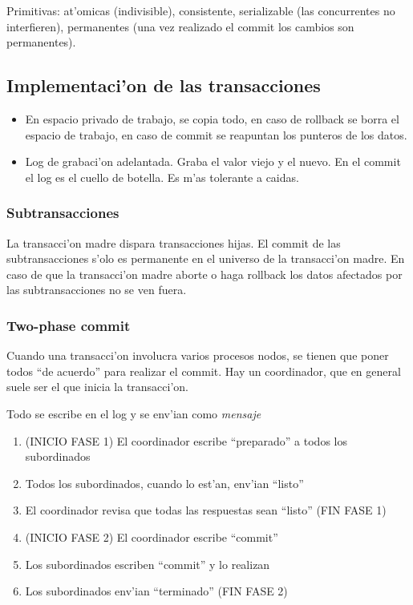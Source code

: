 \documentclass[a4paper,spanish]{article}
\begin{document}
Primitivas: at'omicas (indivisible), consistente, serializable (las concurrentes no
interfieren), permanentes (una vez realizado el commit los cambios son
permanentes).

\subsection{Implementaci'on de las transacciones}
\begin{itemize}
	\item En espacio privado de trabajo, se copia todo, en caso de rollback
se borra el espacio de trabajo, en caso de commit se reapuntan los punteros de
los datos.
	\item Log de grabaci'on adelantada. Graba el valor viejo y el nuevo. En
el commit el log es el cuello de botella. Es m'as tolerante a caidas.
\end{itemize}

\subsubsection{Subtransacciones}
La transacci'on madre dispara transacciones hijas. El commit de las
subtransacciones s'olo es permanente en el universo de la transacci'on madre.
En caso de que la transacci'on madre aborte o haga rollback los datos afectados
por las subtransacciones no se ven fuera.

\subsubsection{Two-phase commit}
Cuando una transacci'on involucra varios procesos nodos, se tienen que poner
todos ``de acuerdo'' para realizar el commit. Hay un coordinador, que en
general suele ser el que inicia la transacci'on.

Todo se escribe en el log y se env'ian como \emph{mensaje}
\begin{enumerate}
	\item (INICIO FASE 1) El coordinador escribe ``preparado'' a todos los
subordinados
	\item Todos los subordinados, cuando lo est'an, env'ian ``listo''
	\item El coordinador revisa que todas las respuestas sean ``listo''
(FIN FASE 1)
	\item (INICIO FASE 2) El coordinador escribe ``commit''
	\item Los subordinados escriben ``commit'' y lo realizan
	\item Los subordinados env'ian ``terminado'' (FIN FASE 2)
\end{enumerate}
\end{document}
